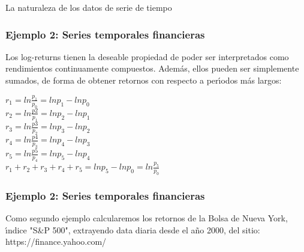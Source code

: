 \documentclass[xcolor=(list of options)]{beamer}
\begin{document}
\begin{section}{La naturaleza de los datos de serie de tiempo}
\begin{frame}
\end{frame}

\begin{frame}
\frametitle{Ejemplo 2: Series temporales financieras}
Los log-returns tienen la deseable propiedad de poder ser interpretados como rendimientos continuamente compuestos. Adem\'as, ellos pueden ser simplemente sumados, de forma de obtener retornos con respecto a per\'\i{}odos m\'as largos:
\begin{center}
$r_1 = ln \frac{p_1}{p_0} = ln p_1 - ln p_0$\\
$r_2 = ln \frac{p2}{p_1} = ln p_2 - ln p_1$\\
$r_3 = ln \frac{p3}{p_2} = ln p_3 - ln p_2$\\
$r_4 = ln \frac{p4}{p_3} = ln p_4 - ln p_3$\\
$r_5 = ln \frac{p5}{p_4} = ln p_5 - ln p_4$\\	
\vspace{5mm}	     			      
$r_1+r_2+r_3+r_4+r_5=ln p_5 - ln p_0    =  ln \frac{p_5}{p_0}$\\
\end{center}
\end{frame}
\begin{frame}
\frametitle{Ejemplo 2: Series temporales financieras}
Como segundo ejemplo calcularemos los retornos de la Bolsa de Nueva York, \'\i{}ndice "S$\&$P 500", extrayendo data diaria desde el a\~no 2000, del sitio: https://finance.yahoo.com/\\


\end{frame}
\end{section}
\end{document}

